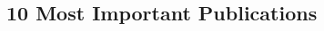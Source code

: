 \documentclass[a4paper,9pt]{article} %
\begin{document}
\begin{thebibliography}{100}
	
%
\section{10 Most Important Publications}%
\vspace{.2cm}








%
%


\end{thebibliography}
\end{document}
